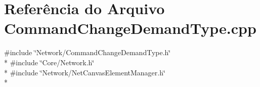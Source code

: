 \section{Referência do Arquivo Command\+Change\+Demand\+Type.\+cpp}
\label{_command_change_demand_type_8cpp}
{\ttfamily \#include \char`\"{}Network/\+Command\+Change\+Demand\+Type.\+h\char`\"{}}\\*
{\ttfamily \#include \char`\"{}Core/\+Network.\+h\char`\"{}}\\*
{\ttfamily \#include \char`\"{}Network/\+Net\+Canvas\+Element\+Manager.\+h\char`\"{}}\\*
